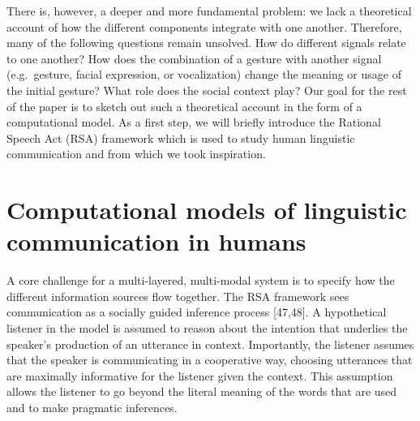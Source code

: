 \documentclass[
  english,
  man,floatsintext]{apa6}
\begin{document}
There is, however, a deeper and more fundamental problem: we lack a theoretical account of how the different components integrate with one another. Therefore, many of the following questions remain unsolved. How do different signals relate to one another? How does the combination of a gesture with another signal (e.g.~gesture, facial expression, or vocalization) change the meaning or usage of the initial gesture? What role does the social context play? Our goal for the rest of the paper is to sketch out such a theoretical account in the form of a computational model. As a first step, we will briefly introduce the Rational Speech Act (RSA) framework which is used to study human linguistic communication and from which we took inspiration.

\hypertarget{computational-models-of-linguistic-communication-in-humans}{%
\section{Computational models of linguistic communication in humans}\label{computational-models-of-linguistic-communication-in-humans}}

A core challenge for a multi-layered, multi-modal system is to specify how the different information sources flow together. The RSA framework sees communication as a socially guided inference process {[}47,48{]}. A hypothetical listener in the model is assumed to reason about the intention that underlies the speaker's production of an utterance in context. Importantly, the listener assumes that the speaker is communicating in a cooperative way, choosing utterances that are maximally informative for the listener given the context. This assumption allows the listener to go beyond the literal meaning of the words that are used and to make pragmatic inferences.
\end{document}

